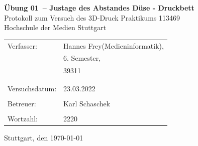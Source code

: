\documentclass[a4paper,12pt,bibtotocnumbered]{scrartcl}
\numberwithin{equation}{section} %
\newcommand{\VERSUCHSDATUM}{23.03.2022}
\newcommand{\PROTOKOLLDATUM}{\today}
\newcommand{\VerfasserEINS}{Hannes Frey}
\newcommand{\MatNoEINS}{39311}
\newcommand{\StudiengangEINS}{Medieninformatik}
\newcommand{\SemesterEINS}{6. Semester}
\newcommand{\VerfasserZWEI}{Verfasser 2}
\newcommand{\MatNoZWEI}{Matrikelnummer 2}
\newcommand{\StudiengangZWEI}{Technologiemanagement}
\newcommand{\BETREUER}{Karl Schaschek}
\newcommand{\WORTZAHL}{2220}
\newcommand{\GRUPPENNR}{Z-999}
\newcommand{\VERSUCHSNR}{Übung 01}
\newcommand{\VERSUCHSNAME}{Justage des Abstandes Düse - Druckbett}
\begin{document}
\thispagestyle{empty}


\begin{titlepage}

\begin{center}
\Huge{\textbf{\VERSUCHSNR\ – \VERSUCHSNAME}}\\%
\vspace{10mm}%
\Large{Protokoll zum Versuch des 3D-Druck Praktikums 113469  %
}\\
\vspace{10mm} 
\Large{Hochschule der Medien Stuttgart}\\
\end{center}
\vspace{1cm}
\begin{center}
\begin{tabular}{ll}
\large{Verfasser:}		& \large{\VerfasserEINS\;(\StudiengangEINS),} \\ 
 						& \large{\SemesterEINS}, \\
 						& \large{\MatNoEINS} \\
						\vspace{0cm}\\
\vspace{0cm}\\
\large{Versuchsdatum:}	& \large{\VERSUCHSDATUM} \\
\vspace{0cm}\\
\large{Betreuer:}		& \large{\BETREUER} \\
\vspace{0cm}\\
\large{Wortzahl:}		& \large{\WORTZAHL}
\end{tabular}
\end{center}
\vspace{65mm}

\begin{center}
Stuttgart, den \PROTOKOLLDATUM
\end{center}

\end{titlepage}
\end{document}
